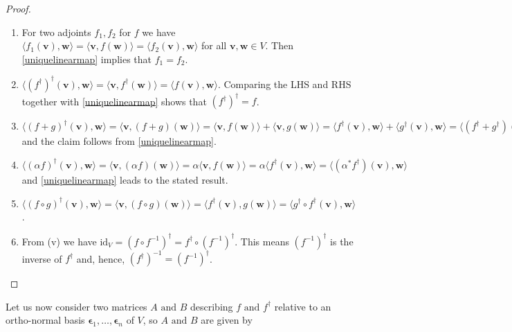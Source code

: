 \documentclass[a4paper,12pt]{report}
\begin{document}
\begin{proof}
    \begin{enumerate}[label=(M\arabic*)]
        \item For two adjoints \(f_1, f_2\) for \(f\) we have \(\langle f_1(\mathbf{v}), \mathbf{w} \rangle = \langle \mathbf{v}, f(\mathbf{w}) \rangle = \langle f_2(\mathbf{v}), \mathbf{w} \rangle\) for all \(\mathbf{v}, \mathbf{w} \in V\). Then \cref{uniquelinearmap} implies that \(f_1 = f_2\).
        \item \(\langle (f^\dagger)^\dagger(\mathbf{v}), \mathbf{w} \rangle = \langle \mathbf{v}, f^\dagger(\mathbf{w}) \rangle = \langle f(\mathbf{v}), \mathbf{w} \rangle\). Comparing the LHS and RHS together with \cref{uniquelinearmap} shows that \((f^\dagger)^\dagger = f\).
        \item \(\langle (f+g)^\dagger(\mathbf{v}), \mathbf{w} \rangle = \langle \mathbf{v}, (f+g)(\mathbf{w}) \rangle = \langle \mathbf{v}, f(\mathbf{w}) \rangle + \langle \mathbf{v}, g(\mathbf{w}) \rangle = \langle f^\dagger(\mathbf{v}), \mathbf{w} \rangle + \langle g^\dagger(\mathbf{v}), \mathbf{w} \rangle = \langle (f^\dagger + g^\dagger)(\mathbf{v}), \mathbf{w} \rangle\) and the claim follows from \cref{uniquelinearmap}.
        \item \(\langle (\alpha f)^\dagger(\mathbf{v}), \mathbf{w} \rangle = \langle \mathbf{v}, (\alpha f)(\mathbf{w}) \rangle = \alpha \langle \mathbf{v}, f(\mathbf{w}) \rangle = \alpha \langle f^\dagger(\mathbf{v}), \mathbf{w} \rangle = \langle (\alpha^* f^\dagger)(\mathbf{v}), \mathbf{w} \rangle\) and \cref{uniquelinearmap} leads to the stated result.
        \item \(\langle (f \circ g)^\dagger(\mathbf{v}), \mathbf{w} \rangle = \langle \mathbf{v}, (f \circ g)(\mathbf{w}) \rangle = \langle f^\dagger(\mathbf{v}), g(\mathbf{w}) \rangle = \langle g^\dagger \circ f^\dagger(\mathbf{v}), \mathbf{w} \rangle\).
        \item From (v) we have \(\text{id}_V = (f \circ f^{-1})^\dagger = f^\dagger \circ (f^{-1})^\dagger\). This means \((f^{-1})^\dagger\) is the inverse of \(f^\dagger\) and, hence, \((f^\dagger)^{-1} = (f^{-1})^\dagger\).
    \end{enumerate}
\end{proof}

Let us now consider two matrices \(A\text { and } B\) describing \(f \text { and } f^{\dagger} \) relative to an ortho-normal basis \(\boldsymbol{\epsilon }_{1}, \ldots , \boldsymbol{\epsilon }_{n}   \) of \(V\), so \(A\text { and } B\) are given by 
\end{document}
